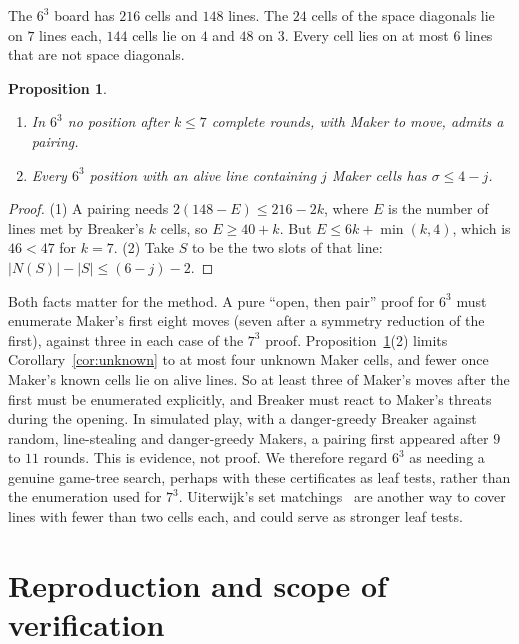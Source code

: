 \documentclass[11pt]{amsart}
\newtheorem{proposition}[theorem]{Proposition}
\theoremstyle{definition}
\theoremstyle{remark}
\begin{document}
The $6^3$ board has $216$ cells and $148$ lines. The $24$ cells of the space diagonals lie on $7$ lines each, $144$ cells lie on $4$ and $48$ on $3$. Every cell lies on at most $6$ lines that are not space diagonals.

\begin{proposition}\label{prop:six}
\leavevmode
\begin{enumerate}
\item In $6^3$ no position after $k\le7$ complete rounds, with Maker to move, admits a pairing.
\item Every $6^3$ position with an alive line containing $j$ Maker cells has $\sigma\le 4-j$.
\end{enumerate}
\end{proposition}

\begin{proof}
(1) A pairing needs $2(148-E)\le 216-2k$, where $E$ is the number of lines met by Breaker's $k$ cells, so $E\ge40+k$. But $E\le 6k+\min(k,4)$, which is $46<47$ for $k=7$. (2) Take $S$ to be the two slots of that line: $|N(S)|-|S|\le(6-j)-2$.
\end{proof}

Both facts matter for the method. A pure ``open, then pair'' proof for $6^3$ must enumerate Maker's first eight moves (seven after a symmetry reduction of the first), against three in each case of the $7^3$ proof. Proposition~\ref{prop:six}(2) limits Corollary~\ref{cor:unknown} to at most four unknown Maker cells, and fewer once Maker's known cells lie on alive lines. So at least three of Maker's moves after the first must be enumerated explicitly, and Breaker must react to Maker's threats during the opening. In simulated play, with a danger-greedy Breaker against random, line-stealing and danger-greedy Makers, a pairing first appeared after $9$ to $11$ rounds. This is evidence, not proof. We therefore regard $6^3$ as needing a genuine game-tree search, perhaps with these certificates as leaf tests, rather than the enumeration used for $7^3$. Uiterwijk's set matchings~\cite{Uiterwijk2017} are another way to cover lines with fewer than two cells each, and could serve as stronger leaf tests.

\section{Reproduction and scope of verification}
\end{document}

